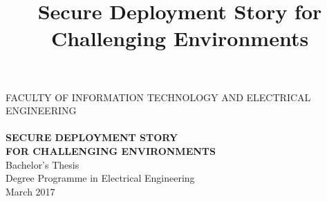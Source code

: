 \documentclass[a4paper,12pt,titlepage]{dithesis}
\title{Secure Deployment Story for Challenging Environments}
\begin{document}
\begin{titlepage}
	{{\small FACULTY OF INFORMATION TECHNOLOGY AND ELECTRICAL ENGINEERING}\\}
	\vspace{65 mm}
	{\textbf{\LARGE \getfirstname\ \getlastname}\\}
	\vspace{15 mm}
	{\textbf{\LARGE SECURE DEPLOYMENT STORY\\FOR CHALLENGING ENVIRONMENTS\\}}
	\vspace{70 mm}
	{\large {Bachelor's Thesis}\\}
	{\large {Degree Programme in Electrical Engineering}\\}
	{\large {March 2017}\\}
\end{titlepage}

\end{document}

